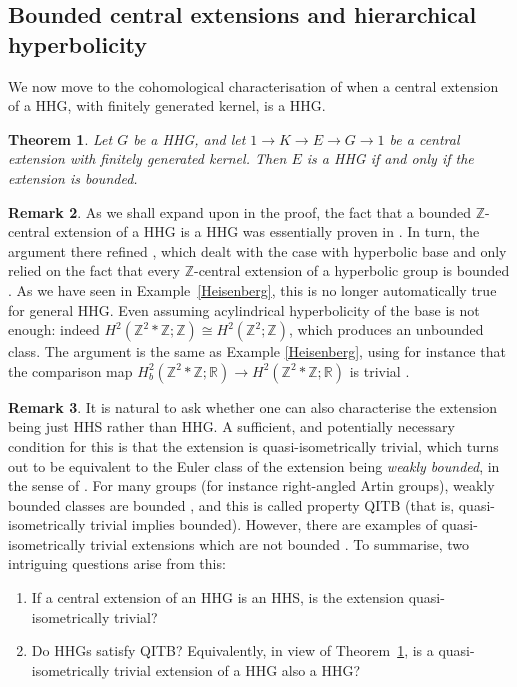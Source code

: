 \documentclass[svgnames]{amsart}
\theoremstyle{plain}
\newtheorem{thm}{Theorem}[section]
\theoremstyle{definition}
\newtheorem{rem}[thm]{Remark}
\newcommand{\Z}{\mathbb{Z}}
\begin{document}
\subsection{Bounded central extensions and hierarchical hyperbolicity}
We now move to the cohomological characterisation of when a central extension of a HHG, with finitely generated kernel, is a HHG. 



\begin{thm}\label{thm:HHG_iff_bounded_abelian_ker}
    Let $G$ be a HHG, and let  $1 \to K \to E \to G \to 1$ be a central extension with finitely generated kernel. Then $E$ is a HHG if and only if the extension is bounded.
\end{thm}

\begin{rem} As we shall expand upon in the proof, the fact that a bounded $\Z$-central extension of a HHG is a HHG was essentially proven in \cite[Proposition 5.14]{uniform_undistortion}.  In turn, the argument there refined \cite[Corollary 4.3]{HRSS_3manifold}, which dealt with the case with hyperbolic base and only relied on the fact that every $\Z$-central extension of a hyperbolic group is bounded \cite{neumannreeves}. As we have seen in Example~\ref{Heisenberg}, this is no longer automatically true for general HHG. Even assuming acylindrical hyperbolicity of the base is not enough: indeed $H^2(\mathbb{Z}^2 \ast \mathbb{Z}; \mathbb{Z}) \cong H^2(\mathbb{Z}^2; \mathbb{Z})$, which produces an unbounded class. The argument is the same as Example \ref{Heisenberg}, using for instance that the comparison map $H^2_b(\mathbb{Z}^2 \ast \mathbb{Z}; \mathbb{R}) \to H^2(\mathbb{Z}^2 \ast \mathbb{Z}; \mathbb{R})$ is trivial \cite[Example 4.7]{kevin}.
\end{rem}

\begin{rem}
    \label{rem:QITB}
    It is natural to ask whether one can also characterise the extension being just HHS rather than HHG. A sufficient, and potentially necessary condition for this is that the extension is quasi-isometrically trivial, which turns out to be equivalent to the Euler class of the extension being \emph{weakly bounded}, in the sense of \cite{neumannreeves}. For many groups (for instance right-angled Artin groups), weakly bounded classes are bounded \cite{frigsisto}, and this is called property QITB (that is, quasi-isometrically trivial implies bounded). However, there are examples of quasi-isometrically trivial extensions which are not bounded \cite{frigsisto,ascarimilizia}. To summarise, two intriguing questions arise from this:
    \begin{enumerate}
        \item If a central extension of an HHG is an HHS, is the extension quasi-isometrically trivial?
        \item\label{do_hhg_have_QITB} Do HHGs satisfy QITB? Equivalently, in view of Theorem~\ref{thm:HHG_iff_bounded_abelian_ker}, is a quasi-isometrically trivial extension of a HHG also a HHG?
    \end{enumerate}
\end{rem}
\end{document}
